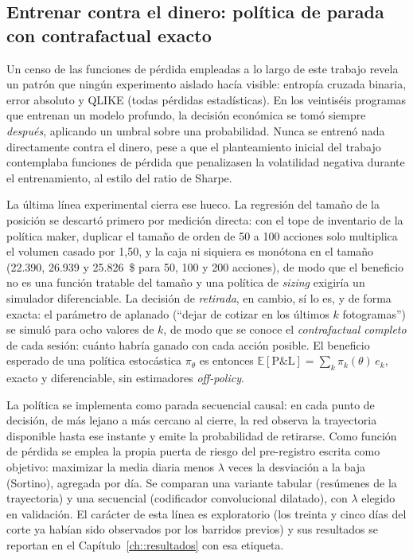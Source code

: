 \subsection{Entrenar contra el dinero: política de parada con contrafactual exacto}
\label{sec::politica_parada}

Un censo de las funciones de pérdida empleadas a lo largo de este trabajo revela un patrón
que ningún experimento aislado hacía visible: entropía cruzada binaria, error absoluto y
QLIKE (todas pérdidas estadísticas). En los veintiséis programas que entrenan un modelo
profundo, la decisión económica se tomó siempre \emph{después}, aplicando un umbral sobre
una probabilidad. Nunca se entrenó nada directamente contra el dinero, pese a que el
planteamiento inicial del trabajo contemplaba funciones de pérdida que penalizasen la
volatilidad negativa durante el entrenamiento, al estilo del ratio de Sharpe.

La última línea experimental cierra ese hueco. La regresión del tamaño de la posición se
descartó primero por medición directa: con el tope de inventario de la política maker,
duplicar el tamaño de orden de 50 a 100 acciones solo multiplica el volumen casado por
1,50, y la caja ni siquiera es monótona en el tamaño (22.390, 26.939 y 25.826~\$ para 50,
100 y 200 acciones), de modo que el beneficio no es una función tratable del tamaño y una
política de \emph{sizing} exigiría un simulador diferenciable. La decisión de
\emph{retirada}, en cambio, sí lo es, y de forma exacta: el parámetro de aplanado
(``dejar de cotizar en los últimos $k$ fotogramas'') se simuló para ocho valores de $k$, de
modo que se conoce el \emph{contrafactual completo} de cada sesión: cuánto habría ganado
con cada acción posible. El beneficio esperado de una política estocástica
$\pi_\theta$ es entonces $\mathbb{E}[\text{P\&L}] = \sum_k \pi_k(\theta)\,e_k$, exacto y
diferenciable, sin estimadores \emph{off-policy}.

La política se implementa como parada secuencial causal: en cada punto de decisión, de más
lejano a más cercano al cierre, la red observa la trayectoria disponible hasta ese instante
y emite la probabilidad de retirarse. Como función de pérdida se emplea la propia puerta
de riesgo del pre-registro escrita como objetivo: maximizar la media diaria menos
$\lambda$ veces la desviación a la baja (Sortino), agregada por día. Se comparan una
variante tabular (resúmenes de la trayectoria) y una secuencial (codificador convolucional
dilatado), con $\lambda$ elegido en validación. El carácter de esta línea es exploratorio
(los treinta y cinco días del corte ya habían sido observados por los barridos previos) y
sus resultados se reportan en el Capítulo~\ref{ch::resultados} con esa etiqueta.
